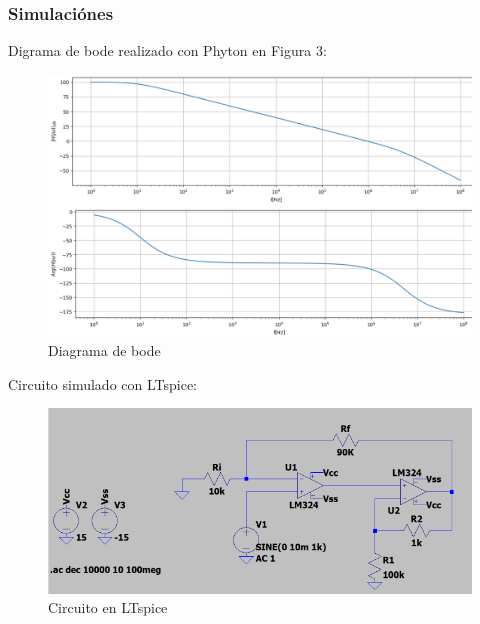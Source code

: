 \documentclass[a4paper,12pt]{article}
\begin{document}
\subsubsection{Simulaciónes}
\vspace{0,2cm}
\hspace{1mm}Digrama de bode realizado con Phyton en Figura 3:
\begin{figure}
    \centering
    \includegraphics[width=0.9\linewidth]{BodeVFA-VFA.png}
    \caption{Diagrama de bode}
    \label{fig:enter-label}
\end{figure}
\newpage
\hspace{1mm}Circuito simulado con LTspice:
\begin{figure}[h]
    \centering
    \includegraphics[width=0.9\linewidth]{CircuitoVFA_VFA-LTspice.png}
    \caption{Circuito en LTspice}
    \label{fig:enter-label}
\end{figure}
\end{document}
